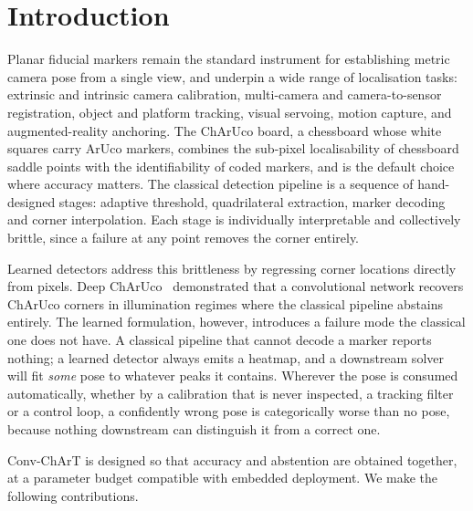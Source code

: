 \documentclass[10pt,twocolumn,letterpaper]{article}
\begin{document}
\section{Introduction}

Planar fiducial markers remain the standard instrument for establishing metric camera pose from a
single view, and underpin a wide range of localisation tasks: extrinsic and intrinsic camera
calibration, multi-camera and camera-to-sensor registration, object and platform tracking, visual
servoing, motion capture, and augmented-reality anchoring. The ChArUco board, a chessboard whose
white squares carry ArUco markers, combines the sub-pixel localisability of chessboard saddle
points with the identifiability of coded markers, and is the default choice where accuracy matters.
The classical detection pipeline is a sequence of hand-designed stages: adaptive threshold,
quadrilateral extraction, marker decoding and corner interpolation. Each stage is individually
interpretable and collectively brittle, since a failure at any point removes the corner entirely.

Learned detectors address this brittleness by regressing corner locations directly from pixels.
Deep ChArUco~\cite{hu2019} demonstrated that a convolutional network recovers ChArUco corners in
illumination regimes where the classical pipeline abstains entirely. The learned formulation,
however, introduces a failure mode the classical one does not have. A classical pipeline that
cannot decode a marker reports nothing; a learned detector always emits a heatmap, and a downstream
solver will fit \emph{some} pose to whatever peaks it contains. Wherever the pose is consumed
automatically, whether by a calibration that is never inspected, a tracking filter or a control
loop, a confidently wrong pose is categorically worse than no pose, because nothing downstream can
distinguish it from a correct one.

Conv-ChArT is designed so that accuracy and abstention are obtained together, at a parameter budget
compatible with embedded deployment. We make the following contributions.
\end{document}
